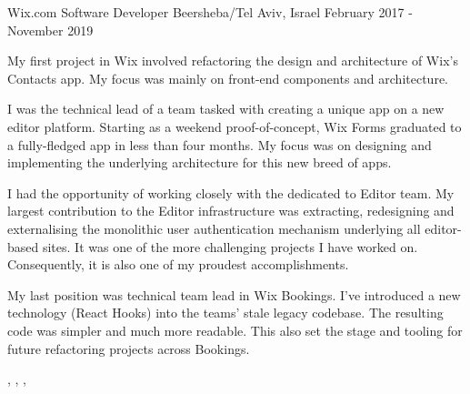 
\begin{cventries}
  \cventry
    {Wix.com}
    {Software Developer}
    {Beersheba/Tel Aviv, Israel}
    {February 2017 - November 2019}
    {
      \begin{cvitems}
        \item {My first project in Wix involved refactoring the design and architecture of Wix’s Contacts app. My focus was mainly on front-end components and architecture.}
        \item {I was the technical lead of a team tasked with creating a unique app on a new editor platform. Starting as a weekend proof-of-concept, Wix Forms graduated to a fully-fledged app in less than four months. My focus was on designing and implementing the underlying architecture for this new breed of apps.}
        \item {I had the opportunity of working closely with the dedicated to Editor team. My largest contribution to the Editor infrastructure was extracting, redesigning and externalising the monolithic user authentication mechanism underlying all editor-based sites. It was one of the more challenging projects I have worked on. Consequently, it is also one of my proudest accomplishments.}
        \item {My last position was technical team lead in Wix Bookings. I've introduced a new technology (React Hooks) into the teams' stale legacy codebase. The resulting code was simpler and much more readable. This also set the stage and tooling for future refactoring projects across Bookings.}
      \end{cvitems}
     }
    
    \begin{cvskills}
       {}
       {, , , }
    \end{cvskills}


\end{cventries}
